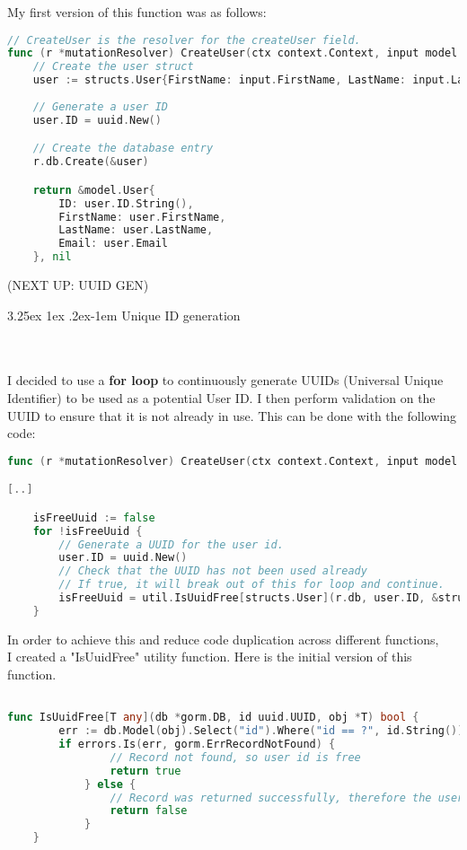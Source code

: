 \documentclass{article}
\makeatletter
\renewcommand\subparagraph{%
\@startsection{subparagraph}{5}{0pt}%
{3.25ex \@plus 1ex \@minus .2ex}{-1em}%
{\normalfont\normalsize\bfseries}}
\makeatother
\begin{document}
\noindent My first version of this function was as follows:

\begin{lstlisting}[language=Go]
// CreateUser is the resolver for the createUser field.
func (r *mutationResolver) CreateUser(ctx context.Context, input model.NewUser) (*model.User, error) {
	// Create the user struct
    user := structs.User{FirstName: input.FirstName, LastName: input.LastName, Email: input.Email}
	
    // Generate a user ID
    user.ID = uuid.New()

    // Create the database entry
	r.db.Create(&user)

	return &model.User{
        ID: user.ID.String(),
        FirstName: user.FirstName,
        LastName: user.LastName,
        Email: user.Email
    }, nil
\end{lstlisting}

(NEXT UP: UUID GEN)

\subparagraph{Unique ID generation}

\noindent \\\\ I decided to use a \textbf{for loop }to continuously generate UUIDs (Universal Unique Identifier) to be used as a potential User ID. I then perform validation on the UUID to ensure that it is not already in use.
This can be done with the following code:

\begin{lstlisting}[language=Go]
func (r *mutationResolver) CreateUser(ctx context.Context, input model.NewUser) (*structs.User, error) {

[..]

	isFreeUuid := false
	for !isFreeUuid {
		// Generate a UUID for the user id.
		user.ID = uuid.New()
		// Check that the UUID has not been used already
		// If true, it will break out of this for loop and continue.
		isFreeUuid = util.IsUuidFree[structs.User](r.db, user.ID, &structs.User{})
	}

\end{lstlisting}

\noindent In order to achieve this and reduce code duplication across different functions, \\
I created a "IsUuidFree" utility function. Here is the initial version of this function.

\begin{lstlisting}[language=Go]

func IsUuidFree[T any](db *gorm.DB, id uuid.UUID, obj *T) bool {
        err := db.Model(obj).Select("id").Where("id == ?", id.String()).First(&obj).Error
        if errors.Is(err, gorm.ErrRecordNotFound) {
                // Record not found, so user id is free
                return true
            } else {
                // Record was returned successfully, therefore the user exists
                return false
            }
    }

\end{lstlisting}
\end{document}

